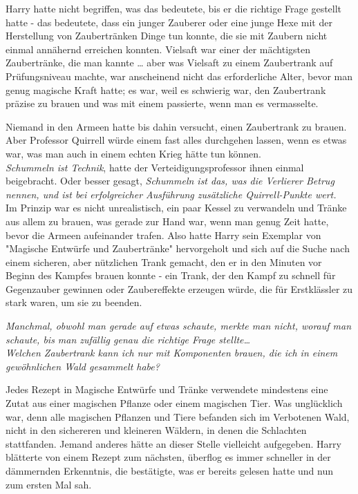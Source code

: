 {Harry hatte nicht begriffen, was das bedeutete, bis er die richtige Frage gestellt hatte - das bedeutete, dass ein junger Zauberer oder eine junge Hexe mit der Herstellung von Zaubertränken Dinge tun konnte, die sie mit Zaubern nicht einmal annähernd erreichen konnten. Vielsaft war einer der mächtigsten Zaubertränke, die man kannte … aber was Vielsaft zu einem Zaubertrank auf Prüfungsniveau machte, war anscheinend nicht das erforderliche Alter, bevor man genug magische Kraft hatte; es war, weil es schwierig war, den Zaubertrank präzise zu brauen und was mit einem passierte, wenn man es vermasselte.

Niemand in den Armeen hatte bis dahin versucht, einen Zaubertrank zu brauen. Aber Professor Quirrell würde einem fast alles durchgehen lassen, wenn es etwas war, was man auch in einem echten Krieg hätte tun können.\\ \emph{Schummeln ist Technik}, hatte der Verteidigungsprofessor ihnen einmal beigebracht. Oder besser gesagt, \emph{Schummeln ist das, was die Verlierer Betrug nennen, und ist bei erfolgreicher Ausführung zusätzliche Quirrell-Punkte wert.}\\ Im Prinzip war es nicht unrealistisch, ein paar Kessel zu verwandeln und Tränke aus allem zu brauen, was gerade zur Hand war, wenn man genug Zeit hatte, bevor die Armeen aufeinander trafen. Also hatte Harry sein Exemplar von "Magische Entwürfe und Zaubertränke" hervorgeholt und sich auf die Suche nach einem sicheren, aber nützlichen Trank gemacht, den er in den Minuten vor Beginn des Kampfes brauen konnte - ein Trank, der den Kampf zu schnell für Gegenzauber gewinnen oder Zaubereffekte erzeugen würde, die für Erstklässler zu stark waren, um sie zu beenden.

\emph{Manchmal, obwohl man gerade auf etwas schaute, merkte man nicht, worauf man schaute, bis man zufällig genau die richtige Frage stellte…}\\ \emph{Welchen Zaubertrank kann ich nur mit Komponenten brauen, die ich in einem gewöhnlichen Wald gesammelt habe?}

Jedes Rezept in Magische Entwürfe und Tränke verwendete mindestens eine Zutat aus einer magischen Pflanze oder einem magischen Tier. Was unglücklich war, denn alle magischen Pflanzen und Tiere befanden sich im Verbotenen Wald, nicht in den sichereren und kleineren Wäldern, in denen die Schlachten stattfanden. Jemand anderes hätte an dieser Stelle vielleicht aufgegeben. Harry blätterte von einem Rezept zum nächsten, überflog es immer schneller in der dämmernden Erkenntnis, die bestätigte, was er bereits gelesen hatte und nun zum ersten Mal sah.

}
